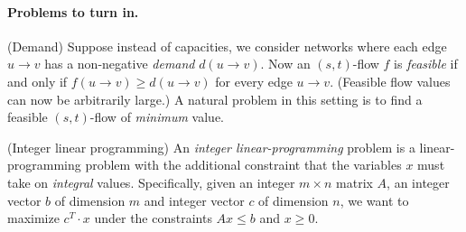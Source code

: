 \paragraph{Problems to turn in.}

\begin{questions}

\question (Demand) Suppose instead of capacities, we consider networks
  where each edge $u\to v$ has a non-negative \emph{demand}
  $d(u\to v)$. Now an $(s,t)$-flow $f$ is \emph{feasible} if and only
  if $f(u\to v)\ge d(u\to v)$ for every edge $u\to v$. (Feasible flow
  values can now be arbitrarily large.) A natural problem in this
  setting is to find a feasible $(s,t)$-flow of \emph{minimum} value.



  \newpage 

  \question (Integer linear programming) An \emph{integer
    linear-programming} problem is a linear-programming problem with
  the additional constraint that the variables $x$ must take on
  \emph{integral} values.  Specifically, given an integer $m\times n$
  matrix $A$, an integer vector $b$ of dimension $m$ and integer
  vector $c$ of dimension $n$, we want to maximize $c^T\cdot x$ under
  the constraints $Ax\le b$ and $x\ge 0$.



\end{questions}
